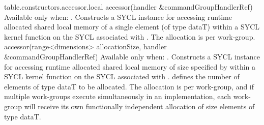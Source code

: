 {table.constructors.accessor.local}
  \addRow
    { accessor(handler \&commandGroupHandlerRef) }
    {
      Available only when: .
      \newline
      Constructs a SYCL  instance for accessing runtime
      allocated shared local memory of a single element (of type dataT) within
      a SYCL kernel function on the SYCL  associated with .  The allocation is per work-group.
    }
  \addRowTwoL
    { accessor(range<dimensions> allocationSize, }
    { handler \&commandGroupHandlerRef) }
    {
      Available only when: .
      \newline      
      Constructs a SYCL  instance for accessing runtime
      allocated shared local memory of size specified by  within a SYCL kernel function on the SYCL  associated with .  
      defines the number of elements of type dataT to be allocated.  The allocation
      is per work-group, and if multiple work-groups execute simultaneously in an
      implementation, each work-group will receive its own functionally independent
      allocation of size  elements of type dataT.
    }
\completeTable

